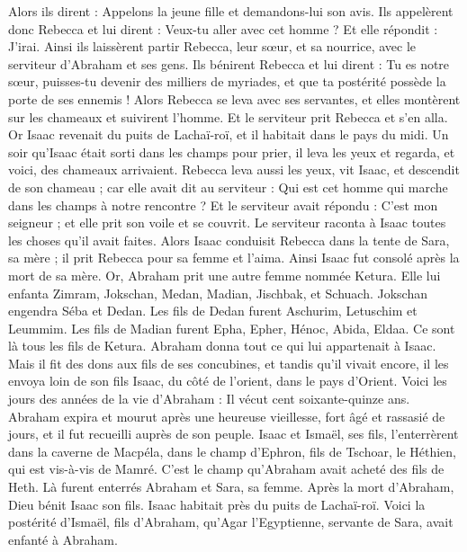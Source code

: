 \begin{multicols}{2}
Alors ils dirent : Appelons la jeune fille et demandons-lui son avis.
Ils appelèrent donc Rebecca et lui dirent : Veux-tu aller avec cet homme ? Et elle répondit : J'irai.
Ainsi ils laissèrent partir Rebecca, leur sœur, et sa nourrice, avec le serviteur d'Abraham et ses gens.
Ils bénirent Rebecca et lui dirent : Tu es notre sœur, puisses-tu devenir des milliers de myriades, et que ta postérité possède la porte de ses ennemis !
Alors Rebecca se leva avec ses servantes, et elles montèrent sur les chameaux et suivirent l’homme. Et le serviteur prit Rebecca et s'en alla.
Or Isaac revenait du puits de Lachaï-roï, et il habitait dans le pays du midi.
Un soir qu’Isaac était sorti dans les champs pour prier, il leva les yeux et regarda, et voici, des chameaux arrivaient.
Rebecca leva aussi les yeux, vit Isaac, et descendit de son chameau ;
car elle avait dit au serviteur : Qui est cet homme qui marche dans les champs à notre rencontre ? Et le serviteur avait répondu : C'est mon seigneur ; et elle prit son voile et se couvrit.
Le serviteur raconta à Isaac toutes les choses qu'il avait faites.
Alors Isaac conduisit Rebecca dans la tente de Sara, sa mère ; il prit Rebecca pour sa femme et l'aima. Ainsi Isaac fut consolé après la mort de sa mère.
\VerseOne{}Or, Abraham prit une autre femme nommée Ketura.
Elle lui enfanta Zimram, Jokschan, Medan, Madian, Jischbak, et Schuach.
Jokschan engendra Séba et Dedan. Les fils de Dedan furent Aschurim, Letuschim et Leummim.
Les fils de Madian furent Epha, Epher, Hénoc, Abida, Eldaa. Ce sont là tous les fils de Ketura.
Abraham donna tout ce qui lui appartenait à Isaac.
Mais il fit des dons aux fils de ses concubines, et tandis qu’il vivait encore, il les envoya loin de son fils Isaac, du côté de l'orient, dans le pays d’Orient.
Voici les jours des années de la vie d’Abraham : Il vécut cent soixante-quinze ans.
Abraham expira et mourut après une heureuse vieillesse, fort âgé et rassasié de jours, et il fut recueilli auprès de son peuple.
Isaac et Ismaël, ses fils, l'enterrèrent dans la caverne de Macpéla, dans le champ d'Ephron, fils de Tschoar, le Héthien, qui est vis-à-vis de Mamré.
C’est le champ qu'Abraham avait acheté des fils de Heth. Là furent enterrés Abraham et Sara, sa femme.
Après la mort d'Abraham, Dieu bénit Isaac son fils.  Isaac habitait près du puits de Lachaï-roï.
Voici la postérité d'Ismaël, fils d'Abraham, qu'Agar l’Egyptienne, servante de Sara, avait enfanté à Abraham.

\end{multicols}
